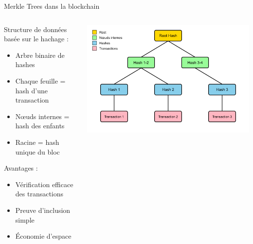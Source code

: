 \begin{frame}{Merkle Trees dans la blockchain}
  \begin{columns}
    \begin{column}{0.6\textwidth}
      Structure de données basée sur le hachage :
      \begin{itemize}
        \item Arbre binaire de hashes
        \item Chaque feuille = hash d'une transaction
        \item Nœuds internes = hash des enfants
        \item Racine = hash unique du bloc
      \end{itemize}

      Avantages :
      \begin{itemize}
        \item Vérification efficace des transactions
        \item Preuve d'inclusion simple
        \item Économie d'espace
      \end{itemize}
    \end{column}

    \begin{column}{0.4\textwidth}
      \begin{center}
        \includegraphics[width=\textwidth]{img/merkle-tree.png}
      \end{center}
    \end{column}
  \end{columns}
\end{frame}

